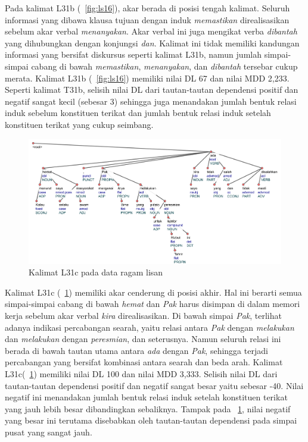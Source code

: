 Pada kalimat L31b (\pic~\ref{fig:ls16}), akar berada di posisi tengah kalimat. Seluruh informasi yang dibawa klausa tujuan dengan induk \textit{memastikan} direalisasikan sebelum akar verbal \textit{menanyakan}. Akar verbal ini juga mengikat verba \textit{dibantah} yang dihubungkan dengan konjungsi \textit{dan}. Kalimat ini tidak memiliki kandungan informasi yang bersifat diskursus seperti kalimat L31b, namun jumlah simpai-simpai cabang di bawah \textit{memastikan}, \textit{menanyakan}, dan \textit{dibantah} tersebar cukup merata. Kalimat L31b (\pic~\ref{fig:ls16}) memiliki nilai DL 67 dan nilai MDD 2,233. Seperti kalimat T31b, selisih nilai DL dari tautan-tautan dependensi positif dan negatif sangat kecil (sebesar 3) sehingga juga menandakan jumlah bentuk relasi induk sebelum konstituen terikat dan jumlah bentuk relasi induk setelah konstituen terikat yang cukup seimbang. 

\begin{figure}
	\centering \includegraphics[width=1
	\textwidth] {pics/ls114.jpg} 
	\caption{Kalimat L31c pada data ragam lisan}
	\label{fig:ls114} 
\end{figure}

Kalimat L31c (\pic~\ref{fig:ls114}) memiliki akar cenderung di posisi akhir. Hal ini berarti semua simpai-simpai cabang di bawah \textit{hemat} dan \textit{Pak} harus disimpan di dalam memori kerja sebelum akar verbal \textit{kira} direalisasikan. Di bawah simpai \textit{Pak}, terlihat adanya indikasi percabangan searah, yaitu relasi antara \textit{Pak} dengan \textit{melakukan} dan \textit{melakukan} dengan \textit{peresmian}, dan seterusnya. Namun seluruh relasi ini berada di bawah tautan utama antara \textit{ada} dengan \textit{Pak}, sehingga terjadi percabangan yang bersifat kombinasi antara searah dan beda arah. Kalimat L31c(\pic~\ref{fig:ls114}) memiliki nilai DL 100 dan nilai MDD 3,333. Selisih nilai DL dari tautan-tautan dependensi positif dan negatif sangat besar yaitu sebesar -40. Nilai negatif ini menandakan jumlah bentuk relasi induk setelah konstituen terikat yang jauh lebih besar dibandingkan sebaliknya. Tampak pada \pic~\ref{fig:ls114}, nilai negatif yang besar ini terutama disebabkan oleh tautan-tautan dependensi pada simpai pusat yang sangat jauh.

